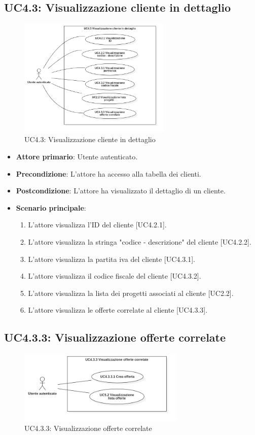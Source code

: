 \subsection{UC4.3: Visualizzazione cliente in dettaglio}
\begin{figure}[!h]
\centering
\includegraphics[width=275px]{../images/UC/.jpeg/UC4.3.0-visualizzazioneDettaglioCliente.jpg}
\caption{UC4.3: Visualizzazione cliente in dettaglio}
\end{figure}

\begin{itemize}
\item \textbf{Attore primario}: Utente autenticato.
\item \textbf{Precondizione}: L'attore ha accesso alla tabella dei clienti.
\item \textbf{Postcondizione}: L'attore ha visualizzato il dettaglio di un cliente.
\item \textbf{Scenario principale}: 
\begin{enumerate}
\item L'attore visualizza l'ID del cliente [UC4.2.1].
\item L'attore visualizza la stringa "codice - descrizione" del cliente [UC4.2.2].
\item L'attore visualizza la partita iva del cliente [UC4.3.1].
\item L'attore visualizza il codice fiscale del cliente [UC4.3.2].
\item L'attore visualizza la lista dei progetti associati al cliente [UC2.2].
\item L'attore visualizza le offerte correlate al cliente [UC4.3.3].
\end{enumerate}
\end{itemize}

\subsection{UC4.3.3: Visualizzazione offerte correlate}
\begin{figure}[!h]
\centering
\includegraphics[width=300px]{../images/UC/.jpeg/UC4.3.3.0-visualizzazioneOfferteCorrelate.jpg}
\caption{UC4.3.3: Visualizzazione offerte correlate}
\end{figure}

